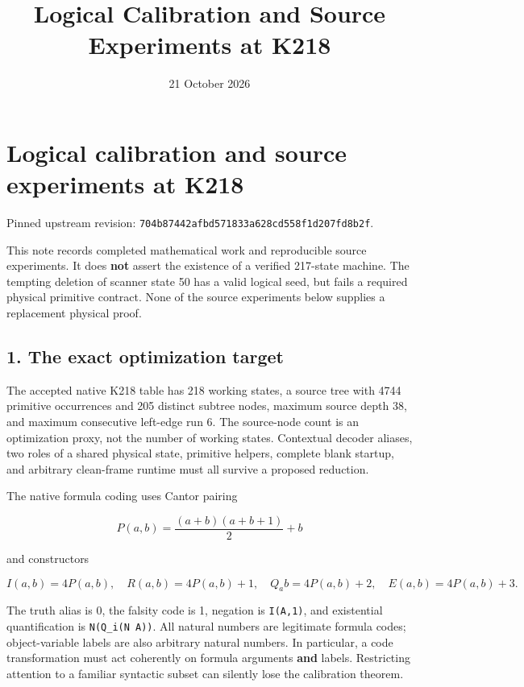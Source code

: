 \documentclass[
  11pt,
]{article}
\title{Logical Calibration and Source Experiments at K218}
\author{}
\date{21 October 2026}
\begin{document}
\maketitle

\hypertarget{logical-calibration-and-source-experiments-at-k218}{%
\section{Logical calibration and source experiments at
K218}\label{logical-calibration-and-source-experiments-at-k218}}

Pinned upstream revision:
\texttt{704b87442afbd571833a628cd558f1d207fd8b2f}.

This note records completed mathematical work and reproducible source
experiments. It does \textbf{not} assert the existence of a verified
217-state machine. The tempting deletion of scanner state 50 has a valid
logical seed, but fails a required physical primitive contract. None of
the source experiments below supplies a replacement physical proof.

\hypertarget{the-exact-optimization-target}{%
\subsection{1. The exact optimization
target}\label{the-exact-optimization-target}}

The accepted native K218 table has 218 working states, a source tree
with 4744 primitive occurrences and 205 distinct subtree nodes, maximum
source depth 38, and maximum consecutive left-edge run 6. The
source-node count is an optimization proxy, not the number of working
states. Contextual decoder aliases, two roles of a shared physical
state, primitive helpers, complete blank startup, and arbitrary
clean-frame runtime must all survive a proposed reduction.

The native formula coding uses Cantor pairing

\[
P(a,b)=\frac{(a+b)(a+b+1)}2+b
\]

and constructors

\[
I(a,b)=4P(a,b),\quad R(a,b)=4P(a,b)+1,\quad
Q_a b=4P(a,b)+2,\quad E(a,b)=4P(a,b)+3.
\]

The truth alias is 0, the falsity code is 1, negation is
\texttt{I(A,1)}, and existential quantification is
\texttt{N(Q\_i(N\ A))}. All natural numbers are legitimate formula
codes; object-variable labels are also arbitrary natural numbers. In
particular, a code transformation must act coherently on formula
arguments \textbf{and} labels. Restricting attention to a familiar
syntactic subset can silently lose the calibration theorem.
\end{document}
